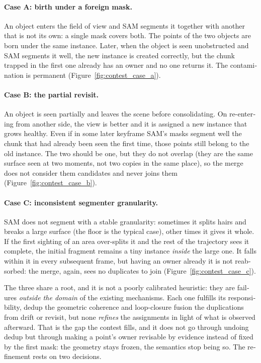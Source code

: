 \begin{otherlanguage}{english}
\paragraph{Case A: birth under a foreign mask.}
An object enters the field of view and SAM segments it together with another that is not its own: a
single mask covers both. The points of the two objects are born under the same instance. Later, when
the object is seen unobstructed and SAM segments it well, the new instance is created correctly, but
the chunk trapped in the first one already has an owner and no one returns it. The contamination is
permanent (Figure~\ref{fig:contest_case_a}).

\paragraph{Case B: the partial revisit.}
An object is seen partially and leaves the scene before consolidating. On re-entering from another
side, the view is better and it is assigned a new instance that grows healthy. Even if in some later
keyframe SAM's masks segment well the chunk that had already been seen the first time, those points
still belong to the old instance. The two should be one, but they do not overlap (they are the same
surface seen at two moments, not two copies in the same place), so the merge does not consider them
candidates and never joins them (Figure~\ref{fig:contest_case_b}).

\paragraph{Case C: inconsistent segmenter granularity.}
SAM does not segment with a stable granularity: sometimes it splits hairs and breaks a large surface
(the floor is the typical case), other times it gives it whole. If the first sighting of an area
over-splits it and the rest of the trajectory sees it complete, the initial fragment remains a tiny
instance \emph{inside} the large one. It falls within it in every subsequent frame, but having an
owner already it is not reabsorbed: the merge, again, sees no duplicates to join
(Figure~\ref{fig:contest_case_c}).

The three share a root, and it is not a poorly calibrated heuristic: they are failures \emph{outside
the domain} of the existing mechanisms. Each one fulfills its responsibility, dedup the geometric
coherence and loop-closure fusion the duplications from drift or revisit, but none \emph{refines} the
assignments in light of what is observed afterward. That is the gap the contest fills, and it does
not go through undoing dedup but through making a point's owner revisable by evidence instead of fixed
by the first mask: the geometry stays frozen, the semantics stop being so. The refinement rests on
two decisions.


\end{otherlanguage}

